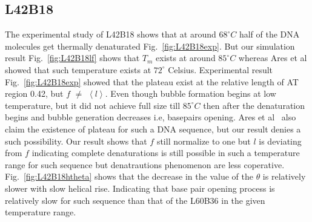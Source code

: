 \documentclass[12pt,masters,final]{UTRGVthesis}
\begin{document}
\subsection{L42B18}
%
The experimental study of L42B18 shows that at around $68^\circ C$ half of the DNA molecules get thermally denaturated Fig.~\ref{fig:L42B18exp}. But our simulation result Fig.~\ref{fig:L42B18lf} shows that $T_{m}$ exists at around $85^\circ C$  whereas Ares et al showed that such temperature exists at $72^\circ$ Celsius. Experimental result Fig.~\ref{fig:L42B18exp} showed that the plateau exist at  the relative length of AT region 0.42, but  $f$ $\neq$ $\left< l \right>$. Even though bubble formation begins at low temperature, but it did not achieve full size till $85^\circ C$  then after the denaturation begins and bubble generation decreases i.e, basepairs opening. Ares et al~\cite{ares2005bubble} also claim the existence of plateau for such a DNA sequence, but our result denies a such possibility. Our result shows that $f$ still normalize to one but $l$ is deviating from $f$ indicating complete denaturations is still possible in such a temperature range for such sequence but denatrautions phenomenon are less coperative. Fig.~\ref{fig:L42B18htheta} shows that the decrease in the value of the $\theta $ is relatively slower with slow helical rise. Indicating that base pair opening process is relatively slow for such sequence than that of the L60B36 in the given temperature range. 
\newpage
%
\end{document}
